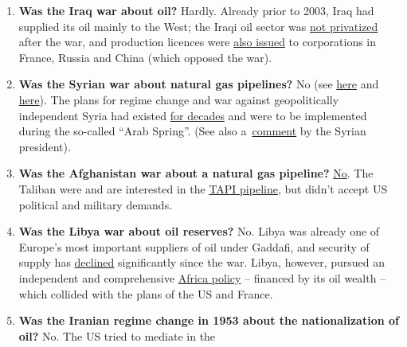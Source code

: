 \begin{enumerate}
  \begin{enumerate}
  \def\labelenumii{\arabic{enumii}.}
  \tightlist
  \item
    \textbf{Was the Iraq war about oil?} Hardly. Already prior to 2003,
    Iraq had supplied its oil mainly to the West; the Iraqi oil sector
    was
    \href{https://theconversation.com/iraq-what-happened-to-the-oil-after-the-war-62188}{not
    privatized} after the war, and production licences were
    \href{https://www.reuters.com/article/us-iraq-oil-contracts/oil-companies-temper-iraqs-dreams-of-production-expansion-idUSKCN1GQ1ID}{also
    issued} to corporations in France, Russia and China (which opposed
    the war).
  \item
    \textbf{Was the Syrian war about natural gas pipelines?} No (see
    \href{https://truthout.org/articles/the-war-against-the-assad-regime-is-not-a-pipeline-war/}{here}
    and
    \href{https://www.middleeasteye.net/big-story/pipelineistan-conspiracy-war-syria-has-never-been-about-gas}{here}).
    The plans for regime change and war against geopolitically
    independent Syria had existed
    \href{https://www.globalresearch.ca/syrian-regime-change-a-70-year-project/5636433}{for
    decades} and were to be implemented during the so-called ``Arab
    Spring''. (See also
    a~\href{https://www.youtube.com/watch?v=flaqLAp0Yp4\&t=1674}{comment}
    by the Syrian president).
  \item
    \textbf{Was the Afghanistan war about a natural gas pipeline?}
    \href{https://slate.com/culture/2001/12/is-the-afghan-war-about-an-oil-pipeline.html}{No}.
    The Taliban were and are interested in the
    \href{https://en.wikipedia.org/wiki/Turkmenistan\%E2\%80\%93Afghanistan\%E2\%80\%93Pakistan\%E2\%80\%93India_Pipeline}{TAPI
    pipeline}, but didn't accept US political and military demands.
  \item
    \textbf{Was the Libya war about oil reserves?} No. Libya was already
    one of Europe's most important suppliers of oil under Gaddafi, and
    security of supply has
    \href{http://www.businessinsider.com/r-how-unstable-is-libyas-oil-production-2018-3}{declined}
    significantly since the war. Libya, however, pursued an independent
    and comprehensive
    \href{https://globalresearch.ca/libya-a-war-on-africa/26474}{Africa
    policy} -- financed by its oil wealth -- which collided with the
    plans of the US and France.
  \item
    \textbf{Was the Iranian regime change in 1953 about the
    nationalization of oil?} No. The US tried to mediate in the

\end{enumerate}
\end{enumerate}
